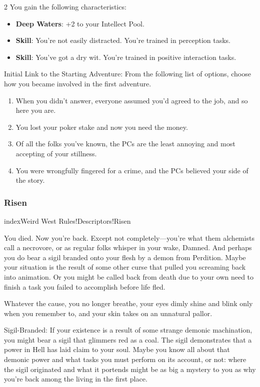 \begin{multicols}{2}
You gain the following characteristics: 

\begin{itemize}
\item \textbf{Deep Waters}: +2 to your Intellect Pool. 
\item \textbf{Skill}: You’re not easily distracted. You’re trained in perception tasks. 
\item \textbf{Skill}: You’ve got a dry wit. You’re trained in positive interaction tasks. 
\end{itemize}

Initial Link to the Starting Adventure: From the following list of options, choose how you became involved in the first adventure.

\begin{enumerate}
\item  When you didn’t answer, everyone assumed you’d agreed to the job, and so here you are. 
\item  You lost your poker stake and now you need the money. 
\item  Of all the folks you’ve known, the PCs are the least annoying and most accepting of your stillness. 
\item You were wrongfully fingered for a crime, and the PCs believed your side of the story.
\end{enumerate}

\subsubsection{Risen}index{Weird West Rules!Descriptors!Risen}

You died. Now you’re back. Except not completely—you’re what them alchemists call a necrovore, or as regular folks whisper in your wake, Damned. And perhaps you do bear a sigil branded onto your flesh by a demon from Perdition. Maybe your situation is the result of some other curse that pulled you screaming back into animation. Or you might be called back from death due to your own need to finish a task you failed to accomplish before life fled. 

Whatever the cause, you no longer breathe, your eyes dimly shine and blink only when you remember to, and your skin takes on an unnatural pallor.

Sigil-Branded: If your existence is a result of some strange demonic machination, you might bear a sigil that glimmers red as a coal. The sigil demonstrates that a power in Hell has laid claim to your soul. Maybe you know all about that demonic power and what tasks you must perform on its account, or not: where the sigil originated and what it portends might be as big a mystery to you as why you’re back among the living in the first place. 


\end{multicols}
